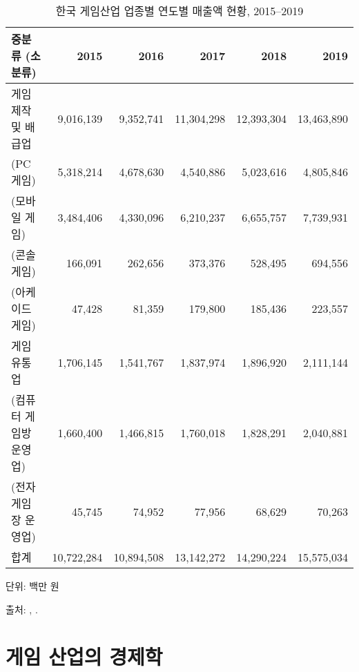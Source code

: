 				\begin{table}[htp]
				\begin{center}
				\begin{threeparttable}
				\caption{한국 게임산업 업종별 연도별 매출액 현황, 2015--2019}\label{tab:koreagameindustrybygenres}
				\begin{tabularx}{\textwidth}{lrrrrr}
				\toprule
				중분류 (소분류) & 2015 & 2016 & 2017 & 2018 & 2019 \\
				\midrule
				게임 제작 및 배급업 & 9,016,139 & 9,352,741 & 11,304,298 & 12,393,304 & 13,463,890 \\
				(PC 게임) & 5,318,214 & 4,678,630 & 4,540,886 & 5,023,616 & 4,805,846 \\
				(모바일 게임) & 3,484,406 & 4,330,096 & 6,210,237 & 6,655,757 & 7,739,931 \\
				(콘솔 게임) & 166,091 & 262,656 & 373,376 & 528,495 & 694,556 \\
				(아케이드 게임) & 47,428 & 81,359 & 179,800 & 185,436 & 223,557 \\
				\midrule
				게임 유통업 & 1,706,145 & 1,541,767 & 1,837,974 & 1,896,920 & 2,111,144 \\
				(컴퓨터 게임방 운영업) & 1,660,400 & 1,466,815 & 1,760,018 & 1,828,291 & 2,040,881 \\
				(전자 게임장 운영업) & 45,745 & 74,952 & 77,956 & 68,629 & 70,263 \\
				\midrule
				합계 & 10,722,284 & 10,894,508 & 13,142,272 & 14,290,224 & 15,575,034 \\
				\bottomrule
				\end{tabularx}
				\begin{tablenotes}
				\small
				\item 단위: 백만 원
				\item 출처: \cite{munhwacheyuggwangwangbu:2018wv}, \cite{munhwacheyuggwangwangbu:2021wo}.
				\end{tablenotes}
				\end{threeparttable}
				\end{center}
				\end{table}%


\section{게임 산업의 경제학}
